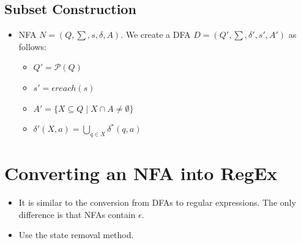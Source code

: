\documentclass[12pt]{article}
\begin{document}
\subsection{Subset Construction}
\begin{itemize}
    \item NFA $N = (Q, \sum, s, \delta, A)$. We create a DFA $D = (Q', \sum, \delta', s', A')$ as follows:
    \begin{itemize}
        \item $Q' = \mathcal{P}(Q)$
        \item $s' = \epsilon reach(s)$
        \item $A' = \{ X \subseteq Q \mid X \cap A \neq \emptyset \}$
        \item $\delta'(X, a) = \bigcup_{q \in X} \delta^{\ast}(q, a)$
    \end{itemize}
\end{itemize}

\section{Converting an NFA into RegEx}
\begin{itemize}
    \item It is similar to the conversion from DFAs to regular expressions. The only difference is that NFAs contain $\epsilon$.
    \item Use the state removal method.
\end{itemize}
\end{document}
